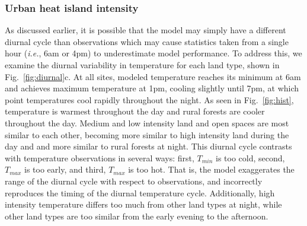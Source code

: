 \documentclass[draft,linenumbers]{agujournal}
\begin{document}
\subsubsection{Urban heat island intensity}
As discussed earlier, it is possible that the model may simply have a different diurnal cycle than observations which may cause statistics taken from a single hour (\textit{i.e.}, 6am or 4pm) to underestimate model performance. To address this, we examine the diurnal variability in temperature for each land type, shown in Fig.~\ref{fig:diurnal}c. At all sites, modeled temperature reaches its minimum at 6am and achieves maximum temperature at 1pm, cooling slightly until  7pm, at which point temperatures cool rapidly throughout the night. As seen in Fig.~\ref{fig:hist}, 
temperature is warmest throughout the day and rural forests are cooler throughout the day. Medium and low intensity land and open spaces are most similar to each other, becoming more similar to high intensity land during the day and and more similar to rural forests at night. 
This diurnal cycle contrasts with temperature observations in several ways: first, $T_{min}$ is too cold, second, $T_{max}$ is too early, and third, $T_{max}$ is too hot. That is, the model exaggerates the range of the diurnal cycle with respect to observations, and incorrectly reproduces the timing of the diurnal temperature cycle. Additionally, high intensity temperature differs too much from other land types at night, while other land types are too similar from the early evening to the afternoon. 
 
\end{document}
